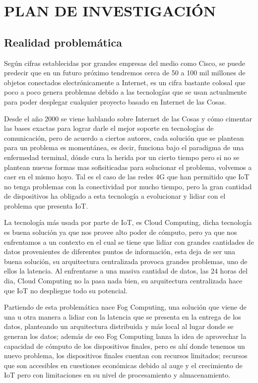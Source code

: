 \newpage

\section{PLAN DE INVESTIGACIÓN}
    \subsection{Realidad problemática}
        Según cifras establecidas por grandes empresas del medio como Cisco,  se puede predecir que en un futuro próximo tendremos cerca de 50 a 100 mil millones de objetos conectados electrónicamente a Internet, es un cifra bastante colosal que poco a poco genera problemas debido a las tecnologías que se usan actualmente para poder desplegar cualquier proyecto basado en Internet de las Cosas.\par
        Desde el año 2000 se viene hablando sobre Internet de las Cosas y cómo cimentar las bases exactas para lograr darle el mejor soporte en tecnologías de comunicación, pero de acuerdo a ciertos autores, cada solución que se plantean para un problema es momentánea, es decir, funciona bajo el paradigma de una enfermedad terminal, dónde cura la herida por un cierto tiempo pero si no se plantean nuevas formas mas sofisiticadas para solucionar el problema, volvemos a caer en el mismo hoyo. Tal es el caso de las redes 4G que han permitido que IoT no tenga problemas con la conectividad por mucho tiempo, pero la gran cantidad de dispositivos ha obligado a esta tecnología a evolucionar y lidiar con el problema que presenta IoT.\par
        La tecnología más usada por parte de IoT, es Cloud Computing, dicha tecnología es buena solución ya que nos provee alto poder de cómputo, pero ya que nos enfrentamos a un contexto en el cual se tiene que lidiar con grandes cantidades de datos provenientes de diferentes puntos de información, esta deja de ser una buena solución,  su arquitectura centralizada provoca grandes problemas, uno de ellos la latencia. Al enfrentarse a una masiva cantidad de datos, las 24 horas del dia, Cloud Computing no la pasa nada bien, su arquitectura centralizada hace que IoT no despliegue todo su potencial. \par
        Partiendo de esta problemática nace Fog Computing, una solución que viene de una u otra manera  a lidiar con la latencia que se presenta en la entrega de los datos, planteando un arquitectura distribuida y más local al lugar donde se generan los datos; además de eso Fog Computing lanza la idea de aprovechar la capacidad de cómputo de los dispositivos finales, pero es ahí donde tenemos un nuevo problema, los dispositivos finales cuentan con recursos limitados; recursos que son accesibles en cuestiones económicas debido al auge y el crecimiento de IoT pero con limitaciones en su nivel de procesamiento y almacenamiento.\par
